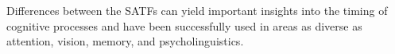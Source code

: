 \documentclass[10pt,letterpaper]{article}
\begin{document}
Differences between the SATFs can yield important insights into the timing of cognitive processes and have been successfully used in areas as diverse as attention, vision, memory, and psycholinguistics. 
%
%
%
\end{document}
